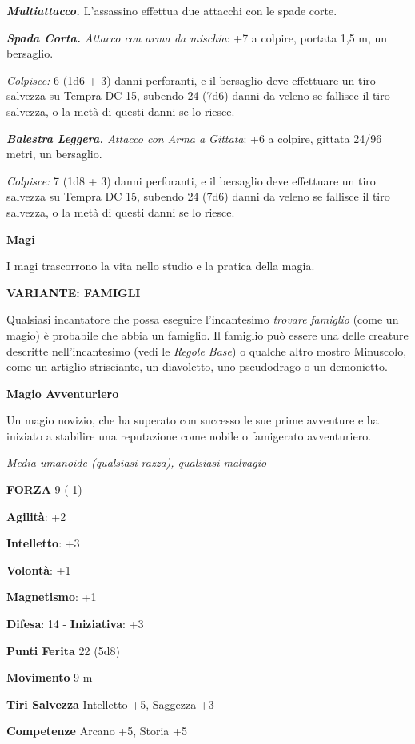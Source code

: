 \begin{multicols}{2}
\emph{\textbf{Multiattacco.}} L'assassino effettua due attacchi con le
spade corte.

\emph{\textbf{Spada Corta.} Attacco con arma da mischia}: +7 a colpire,
portata 1,5 m, un bersaglio.

\emph{Colpisce:} 6 (1d6 + 3) danni perforanti, e il bersaglio deve
effettuare un tiro salvezza su Tempra DC 15, subendo 24 (7d6)
danni da veleno se fallisce il tiro salvezza, o la metà di questi danni
se lo riesce.

\emph{\textbf{Balestra Leggera.} Attacco con Arma a Gittata}: +6 a
colpire, gittata 24/96 metri, un bersaglio.

\emph{Colpisce:} 7 (1d8 + 3) danni perforanti, e il bersaglio deve
effettuare un tiro salvezza su Tempra DC 15, subendo 24 (7d6)
danni da veleno se fallisce il tiro salvezza, o la metà di questi danni
se lo riesce.

\textbf{Magi}

I magi trascorrono la vita nello studio e la pratica della magia.

\textbf{VARIANTE: FAMIGLI}

Qualsiasi incantatore che possa eseguire l'incantesimo \emph{trovare}
\emph{famiglio} (come un magio) è probabile che abbia un famiglio. Il
famiglio può essere una delle creature descritte nell'incantesimo (vedi
le \emph{Regole Base}) o qualche altro mostro Minuscolo, come un
artiglio strisciante, un diavoletto, uno pseudodrago o un demonietto.

\textbf{Magio Avventuriero}

Un magio novizio, che ha superato con successo le sue prime avventure e
ha iniziato a stabilire una reputazione come nobile o famigerato
avventuriero.

\emph{Media umanoide (qualsiasi razza), qualsiasi malvagio}

\textbf{FORZA} 9 (-1)

\textbf{Agilità}: +2

\textbf{Intelletto}: +3

\textbf{Volontà}: +1

\textbf{Magnetismo}: +1

\textbf{Difesa}: 14 - \textbf{Iniziativa}: +3

\textbf{Punti Ferita} 22 (5d8)

\textbf{Movimento} 9 m

\textbf{Tiri Salvezza} Intelletto +5, Saggezza +3

\textbf{Competenze} Arcano +5, Storia +5


\end{multicols}
